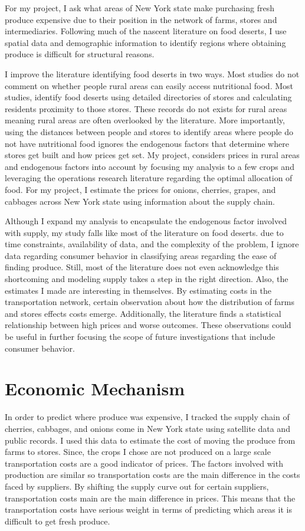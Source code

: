 \documentclass{report}
\begin{document}
For my project, I ask what areas of New York state make purchasing fresh produce expensive due to their position in the network of farms, stores and intermediaries. Following much of the nascent literature on food deserts, I use spatial data and demographic information to identify regions where obtaining produce is difficult for structural reasons.

I improve the literature identifying food deserts in two ways. Most studies do not comment on whether people rural areas can easily access nutritional food. Most studies, identify food deserts using detailed directories of stores and calculating residents proximity to those stores. These records do not exists for rural areas meaning rural areas are often overlooked by the literature. More importantly, using the distances between people and stores to identify areas where people do not have nutritional food ignores the endogenous factors that determine where stores get built and how prices get set. My project, considers prices in rural areas and endogenous factors into account by focusing my analysis to a few crops and leveraging the operations research literature regarding the optimal allocation of food. For my project, I estimate the prices for onions, cherries, grapes, and cabbages across New York state using information about the supply chain.

Although I expand my analysis to encapsulate the endogenous factor involved with supply, my study falls like most of the literature on food deserts. due to time constraints, availability of data, and the complexity of the problem, I ignore data regarding consumer behavior in classifying areas regarding the ease of finding produce. Still, most of the literature does not even acknowledge this shortcoming and modeling supply takes a step in the right direction. Also, the estimates I made are interesting in themselves. By estimating costs in the transportation network, certain observation about how the distribution of farms and stores effects costs emerge. Additionally, the literature finds a statistical relationship between high prices and worse outcomes. These observations could be useful in further focusing the scope of future investigations that include consumer behavior.

\section{Economic Mechanism}

In order to predict where produce was expensive, I tracked the supply chain of cherries, cabbages, and onions come in New York state using satellite data and public records. I used this data to estimate the cost of moving the produce from farms to stores. Since, the crops I chose are not produced on a large scale transportation costs are a good indicator of prices. The factors involved with production are similar so transportation costs are the main difference in the costs faced by suppliers. By shifting the supply curve out for certain suppliers, transportation costs main are the main difference in prices. This means that the transportation costs have serious weight in terms of predicting which areas it is difficult to get fresh produce.
\end{document}
